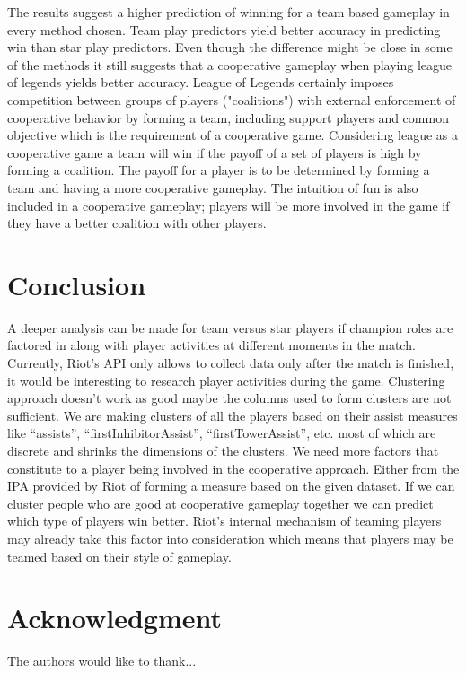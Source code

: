 \documentclass[conference]{IEEEtran}
\begin{document}
The results suggest a higher prediction of winning for a team based gameplay in every method chosen. Team play predictors yield better accuracy in predicting win than star play predictors. Even though the difference might be close in some of the methods it still suggests that a cooperative gameplay when playing league of legends yields better accuracy. League of Legends certainly imposes competition between groups of players ("coalitions") with external enforcement of cooperative behavior by forming a team, including support players and common objective which is the requirement of a cooperative game. Considering league as a cooperative game a team will win if the payoff of a set of players is high by forming a coalition. The payoff for a player is to be determined by forming a team and having a more cooperative gameplay. The intuition of fun is also included in a cooperative gameplay; players will be more involved in the game if they have a better coalition with other players.

\section{Conclusion}


A deeper analysis can be made for team versus star players if champion roles are factored in along with player activities at different moments in the match. Currently, Riot's API only allows to collect data only after the match is finished, it would be interesting to research player activities during the game. Clustering approach doesn’t work as good maybe the columns used to form clusters are not sufficient. We are making clusters of all the players based on their assist measures like “assists”, “firstInhibitorAssist”, “firstTowerAssist”, etc. most of which are discrete and shrinks the dimensions of the clusters. We need more factors that constitute to a player being involved in the cooperative approach. Either from the IPA provided by Riot of forming a measure based on the given dataset. If we can cluster people who are good at cooperative gameplay together we can predict which type of players win better. Riot’s internal mechanism of teaming players may already take this factor into consideration which means that players may be teamed based on their style of gameplay. 

\section*{Acknowledgment}


The authors would like to thank...


\medskip
 

 
\end{document}
